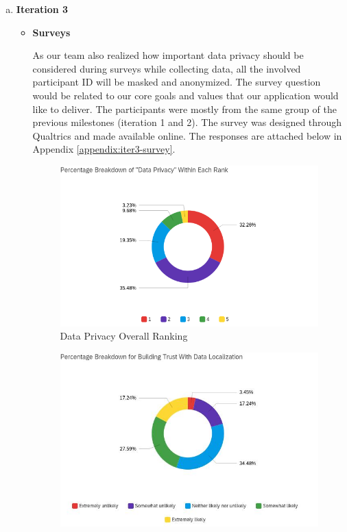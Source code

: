 \begin{enumerate}[a)]
\begin{itemize}
          \end{itemize}
        \item \textbf{Iteration 3}
          \begin{itemize}
            \item \textbf{Surveys}
              \par As our team also realized how important data privacy should be considered during surveys while
              collecting data, all the involved participant ID will be masked and anonymized. The survey question
              would be related to our core goals and values that our application would like to deliver. The
              participants were mostly from the same group of the previous milestones (iteration 1 and 2). The
              survey was designed through Qualtrics and made available online. The responses are attached below
              in Appendix \ref{appendix:iter3-survey}.
                \begin{figure}[H]
                  \centering
                  \includegraphics[width=\linewidth]{img/prototype/iter3-survey-findings-1.png}
                  \caption{Data Privacy Overall Ranking}
                  \label{fig:iter3-survey-findings-1}
                \end{figure}
                \begin{figure}[H]
                  \centering
                  \includegraphics[width=\linewidth]{img/prototype/iter3-survey-findings-2.png}

\end{figure}
\end{itemize}
\end{enumerate}
